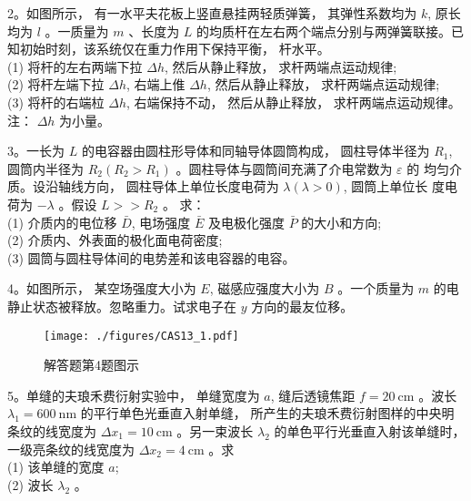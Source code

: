 2。如图所示， 有一水平夫花板上竖直悬挂两轻质弹簧， 其弹性系数均为 $k$, 原长均为 $l$ 。一质量为 $m$ 、长度为 $L$ 的均质杆在左右两个端点分别与两弹簧联接。已知初始时刻，该系统仅在重力作用下保持平衡， 杆水平。\\
(1) 将杆的左右两端下拉 $\Delta h$, 然后从静止释放， 求杆两端点运动规律;\\
(2) 将杆左端下拉 $\Delta h$, 右端上倠 $\Delta h$, 然后从静止释放， 求杆两端点运动规律;\\
(3) 将杆的右端柆 $\Delta h$, 右端保持不动， 然后从静止释放， 求杆两端点运动规律。 注： $\Delta h$ 为小量。

3。一长为 $L$ 的电容器由圆柱形导体和同轴导体圆筒构成， 圆柱导体半径为 $R_{1}$, 圆筒内半径为 $R_{2}\left(R_{2}>R_{1}\right)$ 。圆柱导体与圆筒间充满了介电常数为 $\varepsilon$ 的
均匀介质。设沿轴线方向， 圆柱导体上单位长度电荷为 $\lambda(\lambda>0)$, 圆筒上单位长 度电荷为 $-\lambda$ 。假设 $L>>R_{2}$ 。 求：\\
(1) 介质内的电位移 $\bar{D}$, 电场强度 $\bar{E}$ 及电极化强度 $\bar{P}$ 的大小和方向;\\
(2) 介质内、外表面的极化面电荷密度;\\
(3) 圆筒与圆柱导体间的电势差和该电容器的电容。

4。如图所示， 某空场强度大小为 $E$, 磁感应强度大小为 $B$ 。一个质量为 $m$ 的电静止状态被释放。忽略重力。试求电子在 $y$ 方向的最友位移。
\begin{figure}[ht]
\centering
\texttt{[image: ./figures/CAS13\_1.pdf]}
\caption{解答题第4题图示} \label{CAS13_fig1}
\end{figure}
5。单缝的夫琅禾费衍射实验中， 单缝宽度为 $a$, 缝后透镜焦距 $f=20 \mathrm{~cm}$ 。波长 $\lambda_1= 600 \mathrm{~nm}$ 的平行单色光垂直入射单缝， 所产生的夫琅禾费衍射图样的中央明条纹的线宽度为 $\Delta x_{1}=10 \mathrm{~cm}$ 。另一束波长 $\lambda_{2}$ 的单色平行光垂直入射该单缝时， 一级亮条纹的线宽度为 $\Delta x_{2}=4 \mathrm{~cm}$ 。求\\
(1) 该单缝的宽度 $a$;\\
(2) 波长 $\lambda_{2}$ 。